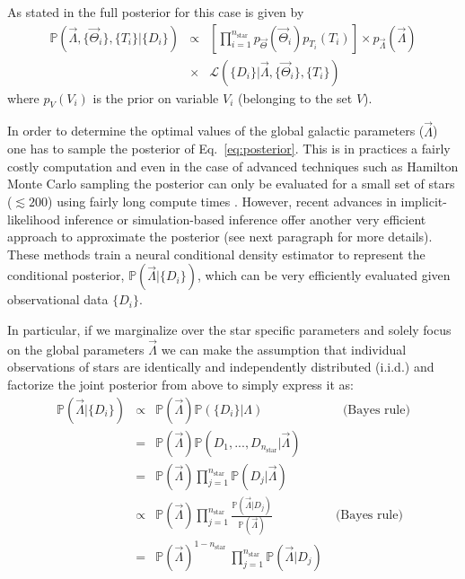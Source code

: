 \documentclass{aa}
\begin{document}
As stated in \citet{Philcox_2019} the full posterior for this case is given by 
\begin{eqnarray}\label{eq:posterior}
    \mathbb{P}(\vec\Lambda,\{\vec\Theta_i\},\{T_i\}|\{D_i\}) &\propto&  \left[\prod_{i=1}^{n_\mathrm{star}}p_{\vec\Theta}(\vec\Theta_i)p_{T_i}(T_i)\right]
    \times p_{\vec\Lambda}(\vec\Lambda)\\
    \nonumber
    &\times& \mathcal{L}(\{D_i\}|\vec\Lambda,\{\vec\Theta_i\},\{T_i\})
\end{eqnarray}
where $p_V(V_i)$ is the prior on variable $V_i$ (belonging to the set $V$).

In order to determine the optimal values of the global galactic parameters ($\Vec{\Lambda}$) one has to sample the posterior of Eq.~\ref{eq:posterior}. This is in practices a fairly costly computation and even in the case of advanced techniques such as Hamilton Monte Carlo sampling the posterior can only be evaluated for a small set of stars ($\lesssim200$) using fairly long compute times \citep[$\sim40$ hours][]{Philcox_2019}.
%
However, recent advances in implicit-likelihood inference or simulation-based inference \citep{Cranmer2020} offer another very efficient approach to approximate the posterior (see next paragraph for more details). These methods train a neural conditional density estimator to represent the conditional posterior, $\mathbb{P}(\vec\Lambda|\{D_i\})$, which can be very efficiently evaluated given observational data $\{D_i\}$.

In particular, if we marginalize over the star specific parameters and solely focus on the global parameters $\Vec{\Lambda}$ we can make the assumption that individual observations of stars are identically and independently distributed (i.i.d.) and factorize the joint posterior from above to simply express it as:  %
\begin{eqnarray}
\mathbb{P}(\vec\Lambda|\{D_i\}) &\propto& 
\mathbb{P}(\vec\Lambda)\mathbb{P}(\{D_i\}|\Lambda)\quad\quad\quad\quad\quad\quad\,\, \text{(Bayes rule)}
\\\nonumber
&=&
\mathbb{P}(\vec\Lambda)\mathbb{P}
(D_1,...,D_{n_\mathrm{star}}|\vec\Lambda)
\\\nonumber
&=& \mathbb{P}(\vec\Lambda)\prod_{j=1}^{n_\mathrm{star}}\mathbb{P}(D_j|\vec\Lambda) 
\\\nonumber
&\propto& \mathbb{P}(\vec\Lambda) \prod_{j=1}^{n_\mathrm{star}}\frac{\mathbb{P}(\vec\Lambda|D_j)}{\mathbb{P}(\vec\Lambda)} \quad\quad\quad\quad\quad\text{(Bayes rule)}
\\%
\label{eq:posterior}
&=& \mathbb{P}(\vec\Lambda)^{1-n_\mathrm{star}}\ \prod_{j=1}^{n_\mathrm{star}}\mathbb{P}(\vec\Lambda|D_j) 
\end{eqnarray}
\end{document}
